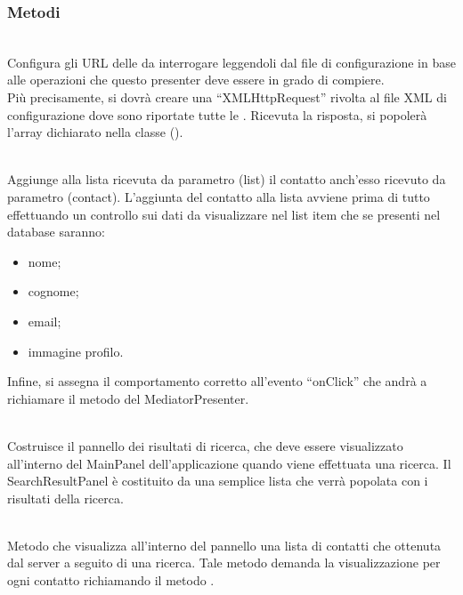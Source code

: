 \subsubsection*{Metodi}
\begin{description}
\item{}\\
Configura gli URL delle  da interrogare leggendoli dal file di configurazione in base alle operazioni che questo presenter deve essere in grado di compiere.\\
Più precisamente, si dovrà creare una ``XMLHttpRequest'' rivolta al file XML di configurazione dove sono riportate tutte le . Ricevuta la risposta, si popolerà l'array dichiarato nella classe ().

\item{}\\
Aggiunge alla lista ricevuta da parametro (list) il contatto anch'esso ricevuto da parametro (contact). L'aggiunta del contatto alla lista avviene prima di tutto effettuando un controllo sui dati da visualizzare nel list item che se presenti nel database saranno:
\begin{itemize}
\item nome;
\item cognome;
\item email;
\item immagine profilo.
\end{itemize}
Infine, si assegna il comportamento corretto all'evento ``onClick'' che andrà a richiamare il metodo  del MediatorPresenter.

\item{}\\
Costruisce il pannello dei risultati di ricerca, che deve essere visualizzato all'interno del MainPanel dell'applicazione quando viene effettuata una ricerca. Il SearchResultPanel è costituito da una semplice lista che verrà popolata con i risultati della ricerca.

\item{}\\
Metodo che visualizza all'interno del pannello una lista di contatti che ottenuta dal server a seguito di una ricerca. Tale metodo demanda la visualizzazione per ogni contatto richiamando il metodo .

\end{description}



